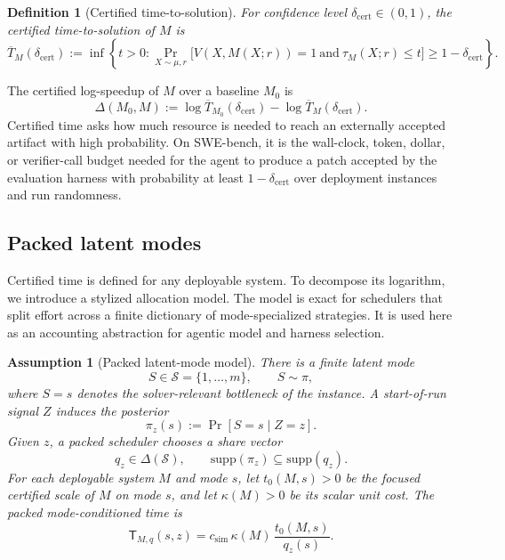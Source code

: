\documentclass{article}
\newtheorem{assumption}{Assumption}
\newtheorem{definition}{Definition}
\newcommand{\cS}{\mathcal{S}}
\begin{document}
\begin{definition}[Certified time-to-solution]
\label{def:certified-time}
For confidence level \(\delta_{\mathrm{cert}}\in(0,1)\), the certified time-to-solution
of \(M\) is
\[
    \overline T_M(\delta_{\mathrm{cert}})
    :=
    \inf\left\{
        t>0:
        \Pr_{X\sim\mu,r}
        \big[
            V(X,M(X;r))=1
            \ \mathrm{and}\
            \tau_M(X;r)\le t
        \big]
        \ge 1-\delta_{\mathrm{cert}}
    \right\}.
\]
\end{definition}
The certified log-speedup of \(M\) over a baseline \(M_0\) is
\[
    \Delta(M_0,M)
    :=
    \log \overline T_{M_0}(\delta_{\mathrm{cert}})
    -
    \log \overline T_M(\delta_{\mathrm{cert}}).
\]
Certified time asks how much resource is needed to reach an externally accepted artifact with high probability.
On SWE-bench, it is the wall-clock, token, dollar, or verifier-call budget needed for the agent to produce a patch accepted by the evaluation harness with probability at least \(1-\delta_{\mathrm{cert}}\) over deployment instances and run randomness.


\subsection{Packed latent modes}
\label{subsec:packed-latent-modes}

Certified time is defined for any deployable system.  To decompose its logarithm, we
introduce a stylized allocation model.  The model is exact for schedulers that split effort
across a finite dictionary of mode-specialized strategies.  It is used here as an accounting
abstraction for agentic model and harness selection.

\begin{assumption}[Packed latent-mode model]
\label{ass:packed}
There is a finite latent mode
\[
    S\in\cS=\{1,\ldots,m\},
    \qquad
    S\sim\pi,
\]
where \(S=s\) denotes the solver-relevant bottleneck of the instance.
A start-of-run signal \(Z\) induces the posterior
\[
    \pi_z(s):=\Pr[S=s\mid Z=z].
\]
Given \(z\), a packed scheduler chooses a share vector
\[
    q_z\in\Delta(\cS),
    \qquad
    \mathrm{supp}(\pi_z)\subseteq \mathrm{supp}(q_z).
\]
For each deployable system \(M\) and mode \(s\), let \(t_0(M,s)>0\) be the focused
certified scale of \(M\) on mode \(s\), and let \(\kappa(M)>0\) be its scalar unit cost.
The packed mode-conditioned time is
\[
    \mathsf T_{M,q}(s,z)
    =
    c_{\mathrm{sim}}\,
    \kappa(M)\,
    \frac{t_0(M,s)}{q_z(s)} .
\]
\end{assumption}
\end{document}

